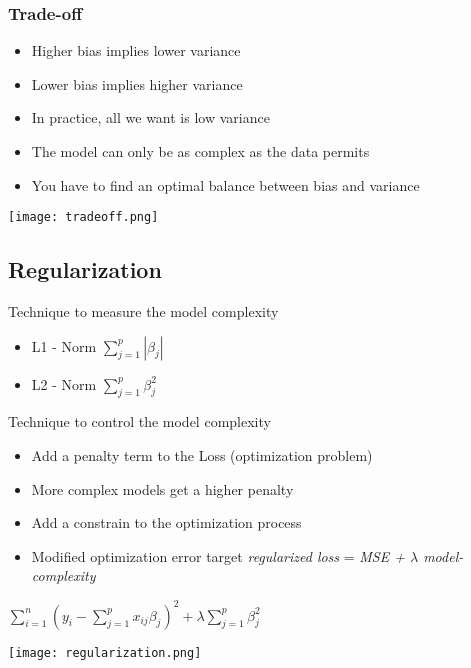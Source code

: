 \subsubsection{Trade-off}
\begin{itemize}
    \item Higher bias implies lower variance
    \item Lower bias implies higher variance
    \item In practice, all we want is low variance
    \item The model can only be as complex as the data permits
    \item You have to find an optimal balance between bias and variance
\end{itemize}
\texttt{[image: tradeoff.png]}

\subsection{Regularization}

Technique to measure the model complexity
\begin{itemize}
    \item L1 - Norm $\displaystyle\sum_{j = 1}^{p} |\beta_j|$
    \item L2 - Norm $\displaystyle\sum_{j = 1}^{p}\beta_j^2$
\end{itemize}
Technique to control the model complexity
\begin{itemize}
    \item Add a penalty term to the Loss (optimization problem)
    \item More complex models get a higher penalty
    \item Add a constrain to the optimization process
    \item Modified optimization error target \textit{regularized loss} = \textit{MSE + $\lambda$ model-complexity}
\end{itemize}
\begin{center}
    $\displaystyle\sum_{i = 1}^{n} (y_i - \displaystyle\sum_{j = 1}^{p} x_{ij}\beta_j)^2 + \lambda \displaystyle\sum_{j = 1}^{p}\beta_j^2$
\end{center}
\texttt{[image: regularization.png]}
